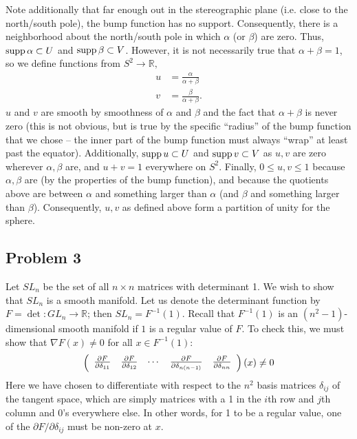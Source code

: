 \documentclass{../../mathnotes}
\begin{document}
Note additionally that far enough out in the stereographic plane (i.e. close to the north/south pole), the bump function has no support. Consequently,
there is a neighborhood about the north/south pole in which $\alpha$ (or $\beta$) are zero. Thus, $\operatorname{supp}\alpha\subset U$ and $\operatorname{supp}\beta\subset V$.
However, it is not necessarily true that $\alpha+\beta=1$, so we define functions from $S^2\to\mathbb{R},$
\begin{align*}
    u&=\frac{\alpha}{\alpha+\beta}\\
    v&=\frac{\beta}{\alpha+\beta}.
\end{align*}
$u$ and $v$ are smooth by smoothness of $\alpha$ and $\beta$ and the fact that $\alpha+\beta$ is never zero (this is not obvious, but is
true by the specific ``radius'' of the bump function that we chose -- the inner part of the bump function must always ``wrap'' at least past the
equator). Additionally, $\operatorname{supp} u\subset U$ and $\operatorname{supp} v\subset V$ as $u,v$ are zero wherever $\alpha,\beta$ are, and $u+v=1$ everywhere
on $S^2$. Finally, $0\leq u,v\leq 1$ because $\alpha,\beta$ are (by the properties of the bump function), and because the quotients
above are between $\alpha$ and something larger than $\alpha$ (and $\beta$ and something larger than $\beta$).
Consequently, $u,v$ as defined above form a partition of unity for the sphere.



\subsection*{Problem 3}

Let $SL_n$ be the set of all $n\times n$ matrices with determinant 1. We wish to show that $SL_n$ is a smooth manifold.
Let us denote the determinant function by $F=\det:GL_n\to\mathbb{R}$; then $SL_n=F^{-1}(1)$. Recall that $F^{-1}(1)$ is an $(n^2-1)$-dimensional
smooth manifold if $1$ is a regular value of $F$. To check this, we must show that $\nabla F(x)\neq 0$ for all $x\in F^{-1}(1)$:
\begin{align*}
    \left(\begin{array}[]{ccccc}
        \frac{\partial F}{\partial\delta_{11}} & \frac{\partial F}{\partial\delta_{12}} & \cdots & \frac{\partial F}{\partial\delta_{n(n-1)}} & \frac{\partial F}{\partial\delta_{nn}}
    \end{array}
    \right)(x)\neq 0
\end{align*}
Here we have chosen to differentiate with respect to the $n^2$ basis matrices $\delta_{ij}$ of the tangent space, which are simply matrices with a 1 
in the $i$th row and $j$th column and 0's everywhere else. In other words, for 1 to be a regular value, one of the $\partial F/\partial\delta_{ij}$ must be non-zero at $x$.
\end{document}
